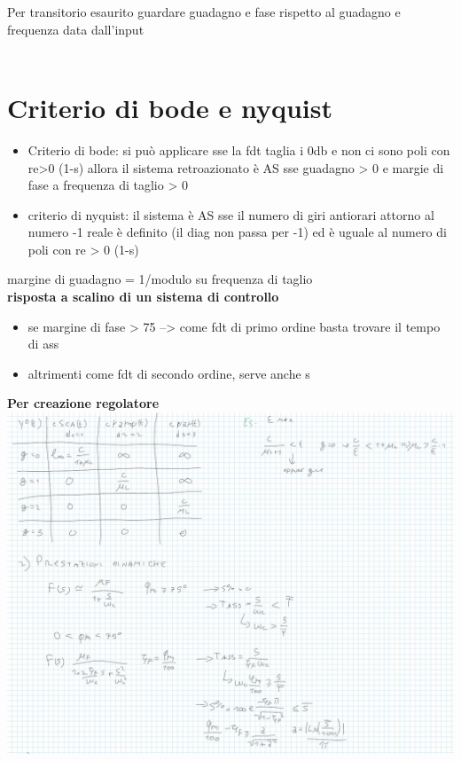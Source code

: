 \documentclass{article}
\begin{document}
\begin{multicols*}{3}
		Per transitorio esaurito guardare guadagno e fase rispetto al guadagno e frequenza data dall'input\\\\
		\section{Criterio di bode e nyquist}
		\begin{itemize}
			\item Criterio di bode: si può applicare sse la fdt taglia i 0db e non ci sono poli con re>0 (1-s) allora il sistema retroazionato è AS sse guadagno > 0 e margie di fase a frequenza di taglio > 0
			\item criterio di nyquist: il sistema è AS sse il numero di giri antiorari attorno al numero -1 reale è definito (il diag non passa per -1) ed è uguale al numero di poli con re > 0 (1-s) \\
		\end{itemize}
	
		margine di guadagno = 1/modulo su frequenza di taglio\\
		
		
		\textbf{risposta a scalino di un sistema di controllo}\\
		\begin{itemize}
			\item se margine di fase > 75 --> come fdt di primo ordine basta trovare il tempo di ass
			\item altrimenti come fdt di secondo ordine, serve anche s%
		\end{itemize}
		
		\textbf{Per creazione regolatore}
		\includegraphics[scale=0.4]{regolatore}
		
		
		
		
		
		
		
		
		
		
		
		
		
		
		
		
		
		
		
		
	\end{multicols*}
\end{document}
